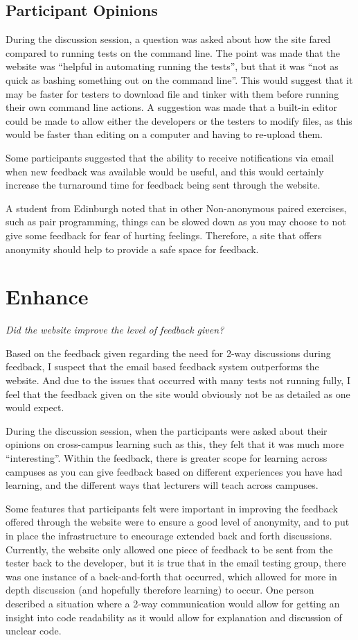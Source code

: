 \documentclass[a4paper,11pt]{report}
\begin{document}
\subsection{Participant Opinions}
During the discussion session, a question was asked about how the site fared compared to running tests on the command line. The point was made that the website was ``helpful in automating running the tests'', but that it was ``not as quick as bashing something out on the command line''. This would suggest that it may be faster for testers to download file and tinker with them before running their own command line actions. A suggestion was made that a built-in editor could be made to allow either the developers or the testers to modify files, as this would be faster than editing on a computer and having to re-upload them.\par
Some participants suggested that the ability to receive notifications via email when new feedback was available would be useful, and this would certainly increase the turnaround time for feedback being sent through the website.\par
A student from Edinburgh noted that in other Non-anonymous paired exercises, such as pair programming, things can be slowed down as you may choose to not give some feedback for fear of hurting feelings. Therefore, a site that offers anonymity should help to provide a safe space for feedback.

\section{Enhance}
\textit{Did the website improve the level of feedback given?}\par
Based on the feedback given regarding the need for 2-way discussions during feedback, I suspect that the email based feedback system outperforms the website. And due to the issues that occurred with many tests not running fully, I feel that the feedback given on the site would obviously not be as detailed as one would expect.\par
During the discussion session, when the participants were asked about their opinions on cross-campus learning such as this, they felt that it was much more ``interesting''. Within the feedback,  there is greater scope for learning across campuses as you can give feedback based on different experiences you have had learning, and the different ways that lecturers will teach across campuses.\par
Some features that participants felt were important in improving the feedback offered through the website were to ensure a good level of anonymity, and to put in place the infrastructure to encourage extended back and forth discussions. Currently, the website only allowed one piece of feedback to be sent from the tester back to the developer, but it is true that in the email testing group, there was one instance of a back-and-forth that occurred, which allowed for more in depth discussion (and hopefully therefore learning) to occur. One person described a situation where a 2-way communication would allow for getting an insight into code readability as it would allow for explanation and discussion of unclear code.\par
\end{document}
